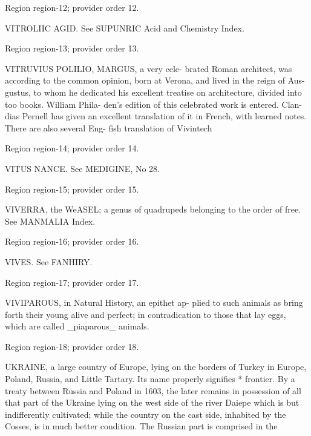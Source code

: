\documentclass[11pt]{article}
\begin{document}
{\scriptsize\color{gray} Region region-12; provider order 12.\par}
\medskip

VITROLIIC AGID. See SUPUNRIC Acid and
Chemistry Index.
\par

{\scriptsize\color{gray} Region region-13; provider order 13.\par}
\medskip

VITRUVIUS POLILIO, MARGUS, a very cele-
brated Roman architect, was according to the common
opinion, born at Verona, and lived in the reign of Aus-
gustus, to whom he dedicated his excellent treatise on
architecture, divided into too books. William Phila-
den’s edition of this celebrated work is entered. Clan-
dias Pernell has given an excellent translation of it in
French, with learned notes. There are also several Eng-
fish translation of Vivintech
\par

{\scriptsize\color{gray} Region region-14; provider order 14.\par}
\medskip

VITUS NANCE. See MEDIGINE, No 28.
\par

{\scriptsize\color{gray} Region region-15; provider order 15.\par}
\medskip

VIVERRA, the WeASEL; a genus of quadrupeds
belonging to the order of free. See MANMALIA Index.
\par

{\scriptsize\color{gray} Region region-16; provider order 16.\par}
\medskip

VIVES. See FANHIRY.
\par

{\scriptsize\color{gray} Region region-17; provider order 17.\par}
\medskip

VIVIPAROUS, in Natural History, an epithet ap-
plied to such animals as bring forth their young alive
and perfect; in contradication to those that lay eggs,
which are called \_piaparous\_ animals.
\par

{\scriptsize\color{gray} Region region-18; provider order 18.\par}
\medskip

UKRAINE, a large country of Europe, lying on
the borders of Turkey in Europe, Poland, Russia, and
Little Tartary. Its name properly signifies * frontier.
By a treaty between Russia and Poland in 1603, the
later remains in possession of all that part of the
Ukraine lying on the west side of the river Daiepe
which is but indifferently cultivated; while the country
on the cast side, inhabited by the Cosses, is in much
better condition. The Russian part is comprised in the
\par
\end{document}
